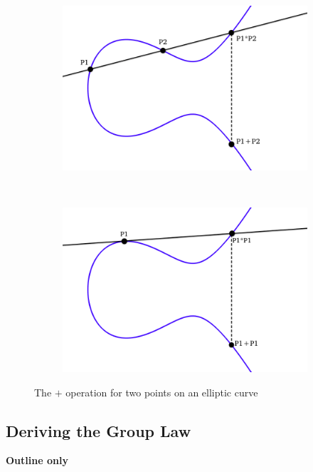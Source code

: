 \documentclass{article}
\begin{document}
\begin{figure}[h]
\centering

\begin{subfigure}{.5\textwidth}
	\centering
	\includegraphics[width=1\linewidth]{images/ec4-plus.png}
	\label{fig:ec-plus-1}
\end{subfigure}%
~%
\begin{subfigure}{.5\textwidth}
	\centering
	\includegraphics[width=1\linewidth]{images/ec4-plus-tangent.png}
	\label{fig:ec-plus-2}
\end{subfigure}

\caption{The $+$ operation for two points on an elliptic curve}

\label{fig:ec-plus}
\end{figure}

\subsection{Deriving the Group Law}
\textbf{Outline only}
\end{document}
